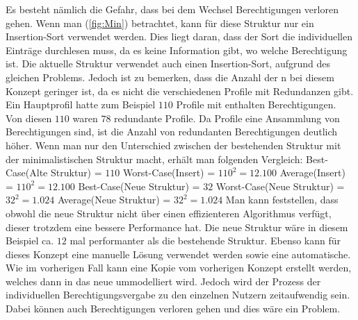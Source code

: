 Es besteht nämlich die Gefahr, dass bei dem Wechsel Berechtigungen verloren gehen.
\newline
\newline
Wenn man (\ref{fig:Min}) betrachtet, kann für diese Struktur nur ein Insertion-Sort verwendet werden.
Dies liegt daran, dass der Sort die individuellen Einträge durchlesen muss, da es keine Information gibt, wo welche Berechtigung ist.
Die aktuelle Struktur verwendet auch einen Insertion-Sort, aufgrund des gleichen Problems.
Jedoch ist zu bemerken, dass die Anzahl der n bei diesem Konzept geringer ist, da es nicht die verschiedenen Profile mit Redundanzen gibt.
\newline
\newline
Ein Hauptprofil hatte zum Beispiel $110$ Profile mit enthalten Berechtigungen.
Von diesen $110$ waren $78$ redundante Profile.
Da Profile eine Ansammlung von Berechtigungen sind, ist die Anzahl von redundanten Berechtigungen deutlich höher.
Wenn man nur den Unterschied zwischen der bestehenden Struktur mit der minimalistischen Struktur macht, erhält man folgenden Vergleich:
\newline
\newline
Best-Case(Alte Struktur) = $110$
\newline
Worst-Case(Insert) = $110^2 = 12.100$
\newline
Average(Insert) = $110^2 = 12.100$
\newline
\newline
Best-Case(Neue Struktur) = $32$
\newline
Worst-Case(Neue Struktur) = $32^2 = 1.024$
\newline
Average(Neue Struktur) = $32^2 = 1.024$
\newline
\newline
Man kann feststellen, dass obwohl die neue Struktur nicht über einen effizienteren Algorithmus verfügt, dieser trotzdem eine bessere Performance hat.
Die neue Struktur wäre in diesem Beispiel ca. $12$ mal performanter als die bestehende Struktur.
\newline
\newline
Ebenso kann für dieses Konzept eine manuelle Lösung verwendet werden sowie eine automatische.
Wie im vorherigen Fall kann eine Kopie vom vorherigen Konzept erstellt werden, welches dann in das neue ummodelliert wird.
Jedoch wird der Prozess der individuellen Berechtigungsvergabe zu den einzelnen Nutzern zeitaufwendig sein.
Dabei können auch Berechtigungen verloren gehen und dies wäre ein Problem.
\newline
